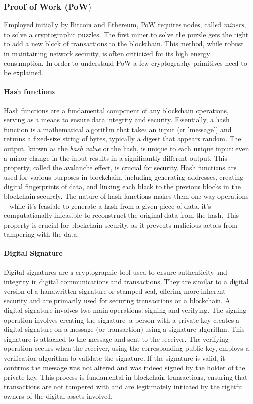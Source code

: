 \subsubsection{Proof of Work (PoW)} 
Employed initially by Bitcoin and Ethereum, PoW requires nodes, called \textit{miners}, to solve a cryptographic puzzles. The first miner to solve the puzzle gets the right to add a new block of transactions to the blockchain. This method, while robust in maintaining network security, is often criticized for its high energy consumption. In order to understand PoW a few cryptography primitives need to be explained.


\paragraph{Hash functions}
Hash functions are a fundamental component of any blockchain operations, serving as a means to ensure data integrity and security. Essentially, a hash function is a mathematical algorithm that takes an input (or 'message') and returns a fixed-size string of bytes, typically a digest that appears random. The output, known as the \textit{hash value} or the hash, is unique to each unique input: even a minor change in the input results in a significantly different output. This property, called the avalanche effect, is crucial for security. Hash functions are used for various purposes in blockchain, including generating addresses, creating digital fingerprints of data, and linking each block to the previous blocks in the blockchain securely. The nature of hash functions makes them one-way operations – while it's feasible to generate a hash from a given piece of data, it's computationally infeasible to reconstruct the original data from the hash. This property is crucial for blockchain security, as it prevents malicious actors from tampering with the data.


\paragraph{Digital Signature}
Digital signatures are a cryptographic tool used to ensure authenticity and integrity in digital communications and transactions. They are similar to a digital version of a handwritten signature or stamped seal, offering more inherent security and are primarily used for securing transactions on a blockchain. A digital signature involves two main operations: signing and verifying. The signing operation involves creating the signature: a person with a private key creates a digital signature on a message (or transaction) using a signature algorithm. This signature is attached to the message and sent to the receiver. The verifying operation occurs when the receiver, using the corresponding public key, employs a verification algorithm to validate the signature. If the signature is valid, it confirms the message was not altered and was indeed signed by the holder of the private key. This process is fundamental in blockchain transactions, ensuring that transactions are not tampered with and are legitimately initiated by the rightful owners of the digital assets involved.


